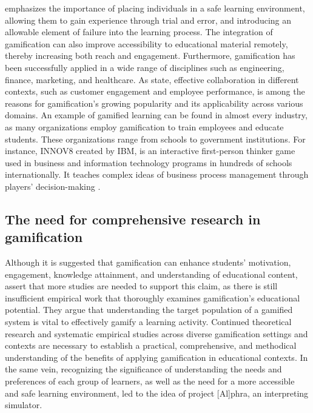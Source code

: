 \documentclass[output=paper]{langscibook}
\begin{document}
\citet[9]{kapp2012gamification} emphasizes the importance of placing individuals in a safe learning environment, allowing them to gain experience through trial and error, and introducing an allowable element of failure into the learning process. The integration of gamification can also improve accessibility to educational material remotely, thereby increasing both reach and engagement. Furthermore, gamification has been successfully applied in a wide range of disciplines such as engineering, finance, marketing, and healthcare. As \citet[1]{dichev2017gamifying} state, effective collaboration in different contexts, such as customer engagement and employee performance, is among the reasons for gamification's growing popularity and its applicability across various domains. An example of gamified learning can be found in almost every industry, as many organizations employ gamification to train employees and educate students. These organizations range from schools to government institutions. For instance, INNOV8 created by IBM, is an interactive first-person thinker game used in business and information technology programs in hundreds of schools internationally. It teaches complex ideas of business process management through players’ decision-making \citep[20]{kapp2012gamification}.

\subsection{The need for comprehensive research in gamification}

Although it is suggested that gamification can enhance students’ motivation, engagement, knowledge attainment, and understanding of educational content, \citet[12]{dichev2017gamifying} assert that more studies are needed to support this claim, as there is still insufficient empirical work that thoroughly examines gamification's educational potential. They argue that understanding the target population of a gamified system is vital to effectively gamify a learning activity. Continued theoretical research and systematic empirical studies across diverse gamification settings and contexts are necessary to establish a practical, comprehensive, and methodical understanding of the benefits of applying gamification in educational contexts. In the same vein, recognizing the significance of understanding the needs and preferences of each group of learners, as well as the need for a more accessible and safe learning environment, led to the idea of project [Al]phra, an interpreting simulator.
\end{document}
